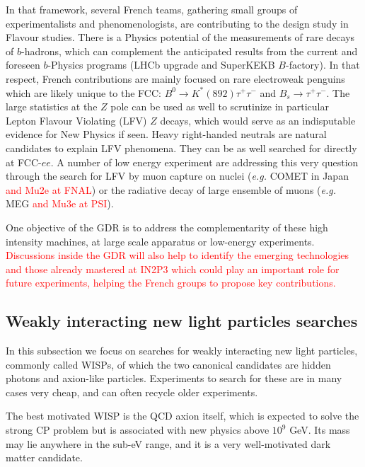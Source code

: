 In that framework, several French teams, gathering small groups of experimentalists and phenomenologists, are contributing to the design study in Flavour studies.  
There is a Physics potential of the measurements of rare decays of $b$-hadrons, which can complement  the anticipated results from the current and foreseen $b$-Physics programs (LHCb upgrade and SuperKEKB $B$-factory). In that respect, French contributions are mainly focused on rare electroweak penguins which are likely unique to the FCC: $B^0 \to K^*(892) \tau^+\tau^-$ and $B_s \to \tau^+ \tau^-$.   
The large statistics at the $Z$ pole can be used as well to scrutinize in particular Lepton Flavour Violating (LFV) $Z$ decays, which would serve as an indisputable evidence for New Physics if seen. Heavy right-handed neutrals are natural candidates to explain LFV phenomena. They can be as well searched for directly at FCC-$ee$. A number of low energy experiment are addressing this very question through the search for LFV by muon capture on nuclei ({\it e.g.} COMET in Japan \textcolor{red}{and Mu2e at FNAL}) or the radiative decay of large ensemble of muons ({\it e.g.} MEG \textcolor{red}{and Mu3e at PSI}). 

One objective of the GDR is to address the complementarity of these high intensity machines,  at large scale apparatus or low-energy experiments.  \textcolor{red}{Discussions inside the GDR will also help to identify the emerging technologies and those already mastered at IN2P3 which could play an important role for future experiments, helping the French groups to propose key contributions.} 

\subsection{Weakly interacting new light particles searches}

In this subsection we focus on searches for weakly interacting new light particles, commonly called WISPs, of which the two canonical candidates are hidden photons and axion-like particles. Experiments to search for these are in many cases very cheap, and can often recycle older experiments. 


The best motivated WISP is the QCD axion itself, which is expected to solve the strong CP problem but is associated with new physics above $10^9$ GeV. Its mass may lie anywhere in the sub-eV range, and it is a very well-motivated dark matter candidate. 


